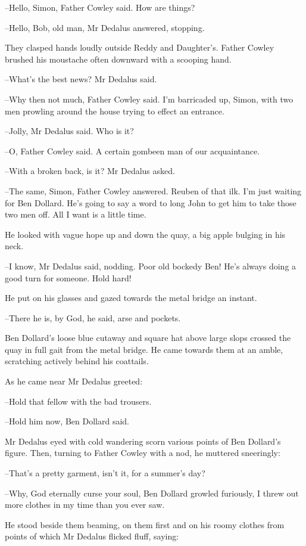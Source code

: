 --Hello, Simon,
Father Cowley said.
How are things?

--Hello, Bob, old man,
Mr Dedalus answered,
stopping.

They clasped hands loudly outside Reddy and Daughter's.
Father Cowley
brushed his moustache often downward
with a scooping hand.

--What's the best news?
Mr Dedalus said.

--Why then not much,
Father Cowley said.
I'm barricaded up, Simon,
with
two men prowling around the house
trying to effect an entrance.

--Jolly,
Mr Dedalus said.
Who is it?

--O,
Father Cowley said.
A certain gombeen man of our acquaintance.

--With a broken back, is it?
Mr Dedalus asked.

--The same, Simon,
Father Cowley answered.
Reuben of that ilk.
I'm just
waiting for Ben Dollard.
He's going to say a word to long John
to get him
to take those two men off.
All I want is a little time.

He looked with vague hope up and down the quay,
a big apple bulging in
his neck.

--I know,
Mr Dedalus said, nodding.
Poor old bockedy Ben!
He's always
doing a good turn for someone.
Hold hard!

He put on his glasses
and gazed towards the metal bridge an instant.

--There he is, by God, he said,
arse and pockets.

Ben Dollard's loose blue cutaway and square hat above large slops
crossed
the quay in full gait
from the metal bridge.
He came towards them at an
amble,
scratching actively behind his coattails.

As he came near
Mr Dedalus greeted:

--Hold that fellow with the bad trousers.

--Hold him now,
Ben Dollard said.

Mr Dedalus eyed with cold wandering scorn
various points of Ben Dollard's
figure.
Then,
turning to Father Cowley with a nod,
he muttered
sneeringly:

--That's a pretty garment, isn't it,
for a summer's day?

--Why, God eternally curse your soul,
Ben Dollard growled furiously,
I
threw out more clothes in my time than you ever saw.

He stood beside them beaming,
on them first and on his roomy clothes
from
points of which Mr Dedalus flicked fluff,
saying:

